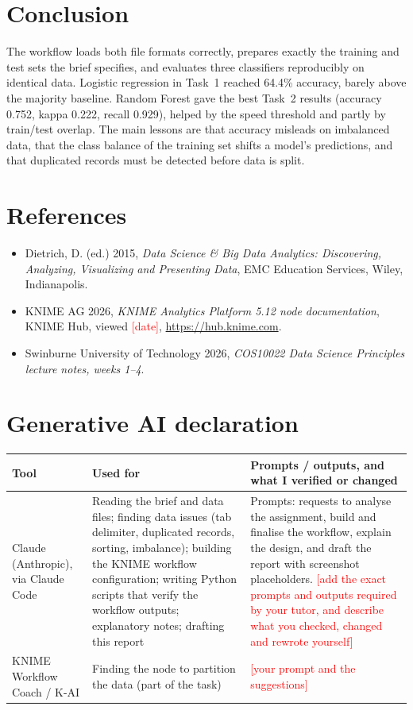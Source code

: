 \documentclass[11pt,a4paper]{article}
\newcommand{\fillin}[1]{\textcolor{Red}{[#1]}}
\begin{document}
\section{Conclusion}
The workflow loads both file formats correctly, prepares exactly the training and test sets the brief specifies, and
evaluates three classifiers reproducibly on identical data. Logistic regression in Task~1 reached 64.4\% accuracy,
barely above the majority baseline. Random Forest gave the best Task~2 results (accuracy 0.752, kappa 0.222, recall
0.929), helped by the speed threshold and partly by train/test overlap. The main lessons are that accuracy misleads on
imbalanced data, that the class balance of the training set shifts a model's predictions, and that duplicated
records must be detected before data is split.

\section*{References}
\begin{itemize}[leftmargin=*]
\item Dietrich, D. (ed.) 2015, \emph{Data Science \& Big Data Analytics: Discovering, Analyzing, Visualizing and
      Presenting Data}, EMC Education Services, Wiley, Indianapolis.
\item KNIME AG 2026, \emph{KNIME Analytics Platform 5.12 node documentation}, KNIME Hub, viewed \fillin{date},
      \url{https://hub.knime.com}.
\item Swinburne University of Technology 2026, \emph{COS10022 Data Science Principles lecture notes, weeks 1--4}.
\end{itemize}

\appendix
\section{Generative AI declaration}
\begin{tabularx}{\linewidth}{@{}p{2.8cm}LL@{}}\toprule
Tool & Used for & Prompts / outputs, and what I verified or changed \\ \midrule
Claude (Anthropic), via Claude Code & Reading the brief and data files; finding data issues (tab delimiter,
  duplicated records, sorting, imbalance); building the KNIME workflow configuration; writing Python scripts that
  verify the workflow outputs; explanatory notes; drafting this report &
  Prompts: requests to analyse the assignment, build and finalise the workflow, explain the design, and draft the
  report with screenshot placeholders. \fillin{add the exact prompts and outputs required by your tutor, and describe
  what you checked, changed and rewrote yourself} \\
KNIME Workflow Coach / K-AI & Finding the node to partition the data (part of the task) & \fillin{your prompt and
  the suggestions} \\ \bottomrule
\end{tabularx}
\end{document}
